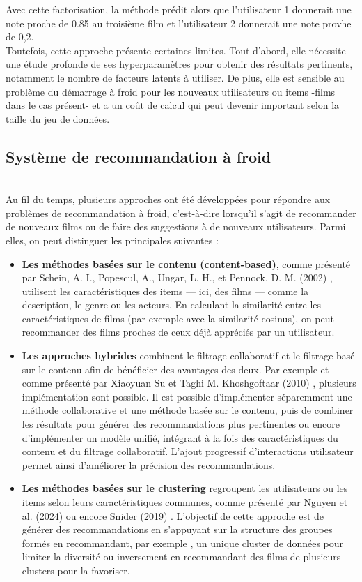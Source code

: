 \documentclass{article}
\begin{document}
Avec cette factorisation, la méthode prédit alors que l'utilisateur 1 donnerait une note
proche de 0.85 au troisième film et l'utilisateur 2 donnerait une note provhe de 0,2.\\
Toutefois, cette approche présente certaines limites. Tout d'abord, elle nécessite une étude
profonde de ses hyperparamètres pour obtenir des résultats pertinents, notamment le nombre de
facteurs latents à utiliser. De plus, elle est sensible au problème du démarrage à froid pour
les nouveaux utilisateurs ou items -films dans le cas présent- et a un coût de calcul qui peut
devenir important selon la taille du jeu de données.

\subsection{Système de recommandation à froid}
$ $\\
Au fil du temps, plusieurs approches ont été développées pour répondre aux problèmes de recommandation à froid,
c’est-à-dire lorsqu’il s’agit de recommander de nouveaux films ou de faire des suggestions à de nouveaux utilisateurs.
Parmi elles, on peut distinguer les principales suivantes :
\begin{itemize}
    \item \textbf{Les méthodes basées sur le contenu (content-based)}, comme présenté par Schein, A. I., Popescul, A., Ungar, L. H.,
          et Pennock, D. M. (2002) \cite{schein2002_methods}, utilisent les caractéristiques des items — ici,
          des films — comme la description, le genre ou les acteurs. En calculant la similarité entre les caractéristiques
          de films (par exemple avec la similarité cosinus), on peut recommander des films proches de ceux déjà appréciés
          par un utilisateur.
    \item \textbf{Les approches hybrides} combinent le filtrage collaboratif et le filtrage basé sur le contenu afin
          de bénéficier des avantages des deux. Par exemple et comme présenté par Xiaoyuan Su et Taghi M. Khoshgoftaar (2010) \cite{su_cf_survey}, plusieurs implémentation sont possible. Il est possible
          d'implémenter séparemment une méthode collaborative et une méthode basée sur le contenu, puis de combiner les résultats pour générer des recommandations
          plus pertinentes ou encore d'implémenter un modèle unifié, intégrant à la fois des caractéristiques du contenu et du filtrage collaboratif.
          L’ajout progressif d’interactions utilisateur permet ainsi d’améliorer la précision des recommandations.
    \item \textbf{Les méthodes basées sur le clustering} regroupent les utilisateurs ou les items selon leurs caractéristiques
          communes, comme présenté par Nguyen et al. (2024)\cite{nguyen2024_ere} ou encore Snider (2019) \cite{snider_unsupervised}.
          L'objectif de cette approche est de générer des recommandations en s’appuyant sur la structure des groupes formés en recommandant, par exemple ,
          un unique cluster de données pour limiter la diversité ou inversement en recommandant des films de plusieurs clusters pour la favoriser.
\end{itemize}
\end{document}
